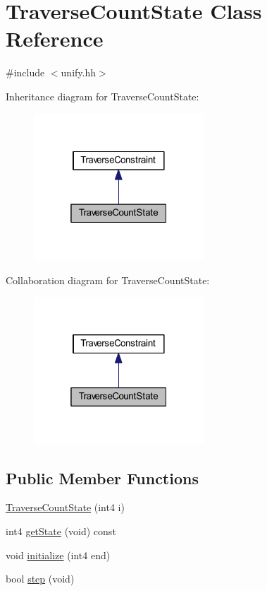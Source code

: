 \hypertarget{class_traverse_count_state}{}\section{Traverse\+Count\+State Class Reference}
\label{class_traverse_count_state}


{\ttfamily \#include $<$unify.\+hh$>$}



Inheritance diagram for Traverse\+Count\+State\+:
\nopagebreak
\begin{figure}[H]
\begin{center}
\leavevmode
\includegraphics[width=181pt]{class_traverse_count_state__inherit__graph}
\end{center}
\end{figure}


Collaboration diagram for Traverse\+Count\+State\+:
\nopagebreak
\begin{figure}[H]
\begin{center}
\leavevmode
\includegraphics[width=181pt]{class_traverse_count_state__coll__graph}
\end{center}
\end{figure}
\subsection*{Public Member Functions}
\begin{DoxyCompactItemize}
\item 
\mbox{\hyperlink{class_traverse_count_state_ae003c367c0e05caf62befa815b047148}{Traverse\+Count\+State}} (int4 i)
\item 
int4 \mbox{\hyperlink{class_traverse_count_state_a3090ac13f5036cd991a297f15584a649}{get\+State}} (void) const
\item 
void \mbox{\hyperlink{class_traverse_count_state_a5ddb09f879e051ef21602a3c283d6216}{initialize}} (int4 end)
\item 
bool \mbox{\hyperlink{class_traverse_count_state_aa628724934c8b276caddeb1158eb9ce0}{step}} (void)
\end{DoxyCompactItemize}
